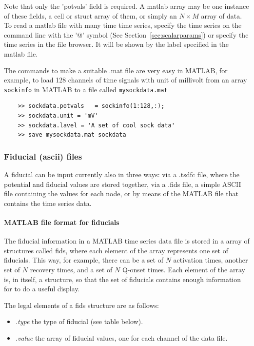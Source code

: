 Note that only the 'potvals' field is required.  A matlab array may 
be one instance of these fields, a cell or struct array of them, or 
simply an $N \times M$ array of data.  To read a matlab file with many time
time series, specify the time series on the command line with the '@' symbol
(See Section~\ref{sec:scalarparams}) or specify the time series in the 
file browser.  It will be shown by the label specified in the matlab file.

The commands to make a suitable .mat file are very easy in MATLAB, for
example, to load 128 channels of time signals with unit of millivolt from
an array \texttt{sockinfo} in MATLAB to a file called
\texttt{mysockdata.mat}
%
\begin{verbatim}
    >> sockdata.potvals   = sockinfo(1:128,:);
    >> sockdata.unit = 'mV'
    >> sockdata.lavel = 'A set of cool sock data'
    >> save mysockdata.mat sockdata
\end{verbatim}

\subsubsection{Fiducial (ascii) files}
\label{sec:fidfiles}

A fiducial can be input currently also in three ways: via a .tsdfc file,
where the potential and fiducial values are stored together, via a .fids
file, a simple ASCII file containing the values for each node, or by means
of the MATLAB file that contains the time series data.

\paragraph{MATLAB file format for fiducials}


The fiducial information in a MATLAB time series data file is stored in a
array of structures called fids, where each element of the array represents
one set of fiducials.  This way, for example, there can be a set of $N$
activation times, another set of $N$ recovery times, and a set of $N$
Q-onset times.  Each element of the array is, in itself, a structure, so
that the set of fiducials contains enough information for \map{} to do a
useful display. 

The legal elements of a fids structure are as follows:
%
\begin{itemize}
  \item \emph{.type} the type of fiducial (see table below).
  \item \emph{.value} the array of fiducial values, one for each 
    channel of the data file.
\end{itemize}


